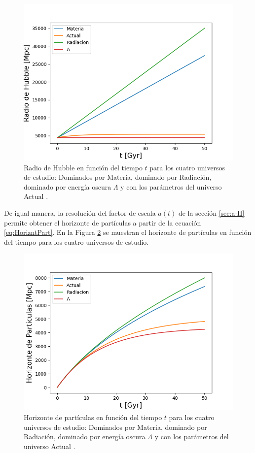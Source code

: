 \documentclass[twoside]{article}
\begin{document}
					\begin{figure}[H]
						\centering
						\includegraphics[scale=0.6]{radio_Hubble.png}
						\caption{\label{Img:RadHbbl}Radio de Hubble en función del tiempo $t$ para los cuatro universos de estudio: Dominados por \textnormal{Materia}, dominado por \textnormal{Radiación}, dominado por energía oscura $\Lambda$ y con los parámetros del universo \textnormal{Actual} \cite{Plank}.}
					\end{figure}

				De igual manera, la resolución del factor de escala $a(t)$ de la sección \ref{sec:a-H} permite obtener el horizonte de partículas a partir de la ecuación \ref{eq:HorizntPart}. En la Figura \ref{Img:HorztPart} se muestran el horizonte de partículas en función del tiempo para los cuatro universos de estudio.

					\begin{figure}[H]
						\centering
						\includegraphics[scale=0.6]{horizonte_Particulas.png}
						\caption{\label{Img:HorztPart}Horizonte de partículas en función del tiempo $t$ para los cuatro universos de estudio: Dominados por \textnormal{Materia}, dominado por \textnormal{Radiación}, dominado por energía oscura $\Lambda$ y con los parámetros del universo \textnormal{Actual} \cite{Plank}.}
					\end{figure}
				
\end{document}
